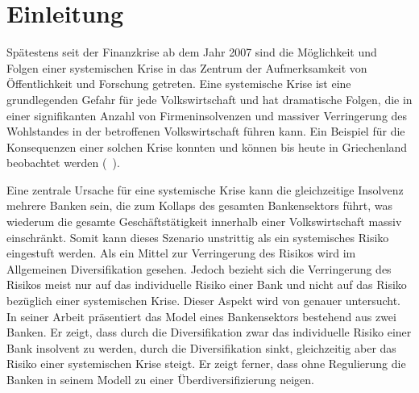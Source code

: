 
\chapter{Einleitung}%
\label{chap:intro}

Spätestens seit der Finanzkrise ab dem Jahr 2007 sind die Möglichkeit und Folgen einer systemischen Krise in das Zentrum der Aufmerksamkeit von Öffentlichkeit und Forschung getreten. Eine systemische Krise ist eine grundlegenden Gefahr für jede Volkswirtschaft und hat dramatische Folgen, die in einer signifikanten Anzahl von Firmeninsolvenzen und massiver Verringerung des Wohlstandes in der betroffenen Volkswirtschaft führen kann. Ein Beispiel für die Konsequenzen einer solchen Krise konnten und können bis heute in Griechenland beobachtet werden (\vgl{}~\cite{Papadimitriou-2013}).

Eine zentrale Ursache für eine systemische Krise kann die gleichzeitige Insolvenz mehrere Banken sein, die zum Kollaps des gesamten Bankensektors führt, was wiederum die gesamte Geschäftstätigkeit innerhalb einer Volkswirtschaft massiv einschränkt. Somit kann dieses Szenario unstrittig als ein systemisches Risiko eingestuft werden. Als ein Mittel zur Verringerung des Risikos wird im Allgemeinen Diversifikation gesehen. Jedoch bezieht sich die Verringerung des Risikos meist nur auf das individuelle Risiko einer Bank und nicht auf das Risiko bezüglich einer systemischen Krise. Dieser Aspekt wird \ua{} von \textcite{Wagner-2010} genauer untersucht. In seiner Arbeit präsentiert \citeauthor{Wagner-2010} das Model eines Bankensektors bestehend aus zwei Banken. Er zeigt, dass durch die Diversifikation zwar das individuelle Risiko einer Bank insolvent zu werden, durch die Diversifikation sinkt, gleichzeitig aber das Risiko einer systemischen Krise steigt. Er zeigt ferner, dass ohne Regulierung die Banken in seinem Modell zu einer Überdiversifizierung neigen.


